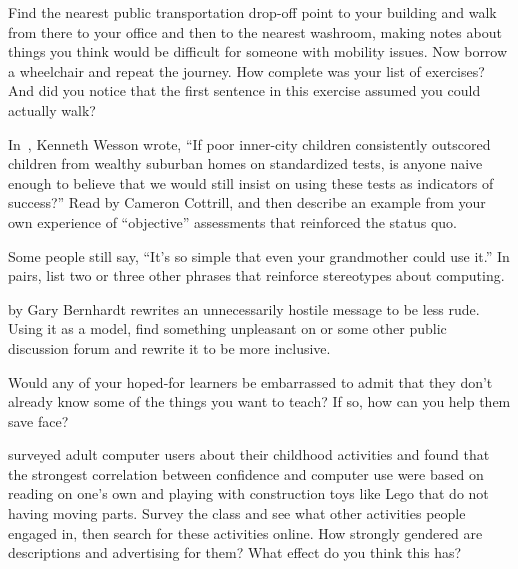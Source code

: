 
Find the nearest public transportation drop-off point to your building
and walk from there to your office and then to the nearest washroom,
making notes about things you think would be difficult for someone with mobility issues.
Now borrow a wheelchair and repeat the journey.
How complete was your list of exercises?
And did you notice that the first sentence in this exercise assumed you could actually walk?


In~\cite{Litt2004},
Kenneth Wesson wrote,
``If poor inner-city children consistently outscored children from wealthy suburban homes on standardized tests,
is anyone naive enough to believe that we would still insist on using these tests as indicators of success?''
Read 
by Cameron Cottrill,
and then describe an example from your own experience of ``objective'' assessments that reinforced the status quo.


Some people still say, ``It's so simple that even your grandmother could use it.''
In pairs,
list two or three other phrases that reinforce stereotypes about computing.


by Gary Bernhardt
rewrites an unnecessarily hostile message to be less rude.
Using it as a model,
find something unpleasant on  or some other public discussion forum
and rewrite it to be more inclusive.


Would any of your hoped-for learners be embarrassed to admit that
they don't already know some of the things you want to teach?
If so,
how can you help them save face?


\cite{Cutt2017} surveyed adult computer users about their childhood activities
and found that the strongest correlation between confidence and computer use
were based on reading on one's own and playing with construction toys like Lego that do not having moving parts.
Survey the class and see what other activities people engaged in,
then search for these activities online.
How strongly gendered are descriptions and advertising for them?
What effect do you think this has?

